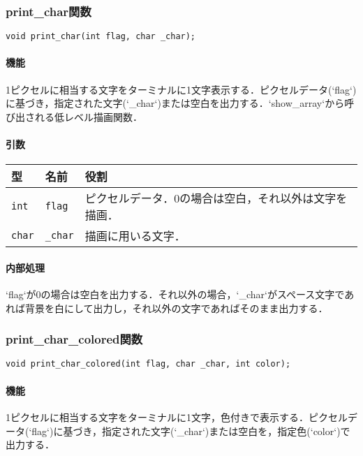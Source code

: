 \documentclass[uplatex]{jsarticle}
\begin{document}
\subsubsection{print\_char関数}
\texttt{void print\_char(int flag, char \_char);}
\paragraph{機能}
1ピクセルに相当する文字をターミナルに1文字表示する．ピクセルデータ(`flag`)に基づき，指定された文字(`\_char`)または空白を出力する．`show\_array`から呼び出される低レベル描画関数．

\paragraph{引数}
\begin{center}
    \begin{tabular}{|l|l|p{7cm}|}
        \hline
        \textbf{型} & \textbf{名前} & \textbf{役割} \\ \hline
        \texttt{int} & \texttt{flag} & ピクセルデータ．0の場合は空白，それ以外は文字を描画． \\ \hline
        \texttt{char} & \texttt{\_char} & 描画に用いる文字． \\ \hline
    \end{tabular}
\end{center}

\paragraph{内部処理}
`flag`が0の場合は空白を出力する．それ以外の場合，`\_char`がスペース文字であれば背景を白にして出力し，それ以外の文字であればそのまま出力する．

\subsubsection{print\_char\_colored関数}
\texttt{void print\_char\_colored(int flag, char \_char, int color);}
\paragraph{機能}
1ピクセルに相当する文字をターミナルに1文字，色付きで表示する．ピクセルデータ(`flag`)に基づき，指定された文字(`\_char`)または空白を，指定色(`color`)で出力する．
\end{document}
